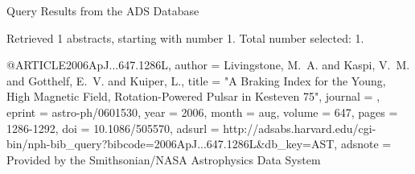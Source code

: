 Query Results from the ADS Database


Retrieved 1 abstracts, starting with number 1.  Total number selected: 1.

@ARTICLE{2006ApJ...647.1286L,
   author = {{Livingstone}, M.~A. and {Kaspi}, V.~M. and {Gotthelf}, E.~V. and 
	{Kuiper}, L.},
    title = "{A Braking Index for the Young, High Magnetic Field, Rotation-Powered Pulsar in Kesteven 75}",
  journal = {\apj},
   eprint = {astro-ph/0601530},
     year = 2006,
    month = aug,
   volume = 647,
    pages = {1286-1292},
      doi = {10.1086/505570},
   adsurl = {http://adsabs.harvard.edu/cgi-bin/nph-bib_query?bibcode=2006ApJ...647.1286L&db_key=AST},
  adsnote = {Provided by the Smithsonian/NASA Astrophysics Data System}
}


